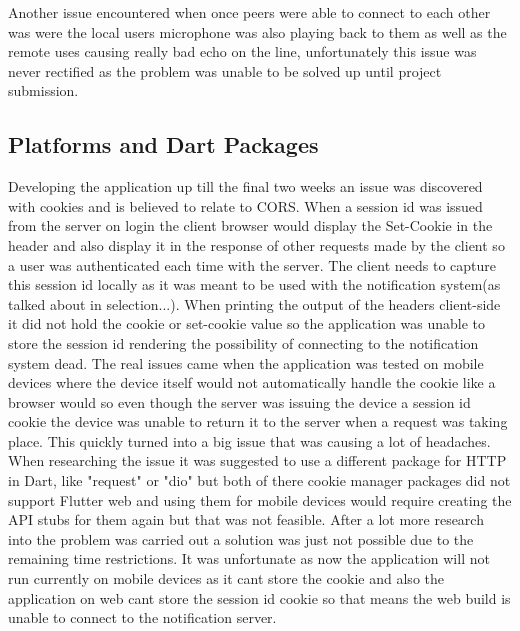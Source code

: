 Another issue encountered when once peers were able to connect to each other was were the local users microphone was also playing back to them as well as the remote uses causing really bad echo on the line, unfortunately this issue was never rectified as the problem was unable to be solved up until project submission. 



\subsection{Platforms and Dart Packages}
Developing the application up till the final two weeks an issue was discovered with cookies and is believed to relate to CORS. When a session id was issued from the server on login the client browser would display the Set-Cookie in the header and also display it in the response of other requests made by the client so a user was authenticated each time with the server. The client needs to capture this session id locally as it was meant to be used with the notification system(as talked about in selection...). When printing the output of the headers client-side it did not hold the cookie or set-cookie value so the application was unable to store the session id rendering the possibility of connecting to the notification system dead. The real issues came when the application was tested on mobile devices where the device itself would not automatically handle the cookie like a browser would so even though the server was issuing the device a session id cookie the device was unable to return it to the server when a request was taking place. This quickly turned into a big issue that was causing a lot of headaches. When researching the issue it was suggested to use a different package for HTTP in Dart, like "request" or "dio" but both of there cookie manager packages did not support Flutter web and using them for mobile devices would require creating the API stubs for them again but that was not feasible. After a lot more research into the problem was carried out a solution was just not possible due to the remaining time restrictions. It was unfortunate as now the application will not run currently on mobile devices as it cant store the cookie and also the application on web cant store the session id cookie so that means the web build is unable to connect to the notification server.


